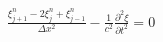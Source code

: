 \documentclass[preview]{standalone}
\begin{document}
\begin{align*}
\frac{\xi_{j+1}^{n} - 2 \xi_{j}^{n} + \xi_{j-1}^{n}}{\Delta x^2} - \frac{1}{c^2}\frac{\partial^2 \xi}{\partial t^2}  = 0
\end{align*}
\end{document}
